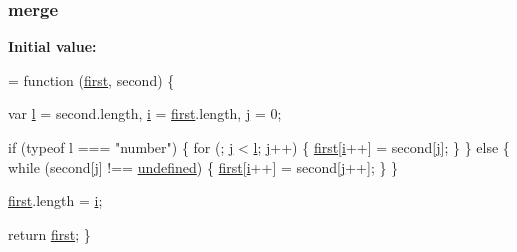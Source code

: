 \subsubsection[{\texorpdfstring{merge}{merge}}]{ merge}\hypertarget{jquery-2_82_81-vsdoc_8js_a32b25eeaa50c1bd6453e8956949b36e3}{}\label{jquery-2_82_81-vsdoc_8js_a32b25eeaa50c1bd6453e8956949b36e3}
{\bfseries Initial value\+:}
\begin{DoxyCode}
= \textcolor{keyword}{function} (\hyperlink{jquery-2_82_81-vsdoc_8js_a436adcac6bdff190fbce85670078e885}{first}, second) \{
        

        var \hyperlink{geolocation-marker_8js_ae5e71a2600e8891c54854be157cc6626}{l} = second.length,
            \hyperlink{geolocation-marker_8js_a0325b7ce0988782a8032e720ef3aa411}{i} = \hyperlink{jquery-2_82_81-vsdoc_8js_a436adcac6bdff190fbce85670078e885}{first}.length,
            \hyperlink{geolocation-marker_8js_af0ba8fb208a5f5ab73eb0859811a23f8}{j} = 0;

        \textcolor{keywordflow}{if} (typeof l === \textcolor{stringliteral}{"number"}) \{
            \textcolor{keywordflow}{for} (; \hyperlink{geolocation-marker_8js_af0ba8fb208a5f5ab73eb0859811a23f8}{j} < \hyperlink{geolocation-marker_8js_ae5e71a2600e8891c54854be157cc6626}{l}; \hyperlink{geolocation-marker_8js_af0ba8fb208a5f5ab73eb0859811a23f8}{j}++) \{
                \hyperlink{jquery-2_82_81-vsdoc_8js_a436adcac6bdff190fbce85670078e885}{first}[\hyperlink{geolocation-marker_8js_a0325b7ce0988782a8032e720ef3aa411}{i}++] = second[\hyperlink{geolocation-marker_8js_af0ba8fb208a5f5ab73eb0859811a23f8}{j}];
            \}
        \} \textcolor{keywordflow}{else} \{
            \textcolor{keywordflow}{while} (second[\hyperlink{geolocation-marker_8js_af0ba8fb208a5f5ab73eb0859811a23f8}{j}] !== \hyperlink{jquery-2_82_81-vsdoc_8js_a08113a236cc18d2a9d5ce27e638012be}{undefined}) \{
                \hyperlink{jquery-2_82_81-vsdoc_8js_a436adcac6bdff190fbce85670078e885}{first}[\hyperlink{geolocation-marker_8js_a0325b7ce0988782a8032e720ef3aa411}{i}++] = second[\hyperlink{geolocation-marker_8js_af0ba8fb208a5f5ab73eb0859811a23f8}{j}++];
            \}
        \}

        \hyperlink{jquery-2_82_81-vsdoc_8js_a436adcac6bdff190fbce85670078e885}{first}.length = \hyperlink{geolocation-marker_8js_a0325b7ce0988782a8032e720ef3aa411}{i};

        \textcolor{keywordflow}{return} \hyperlink{jquery-2_82_81-vsdoc_8js_a436adcac6bdff190fbce85670078e885}{first};
    \}
\end{DoxyCode}
